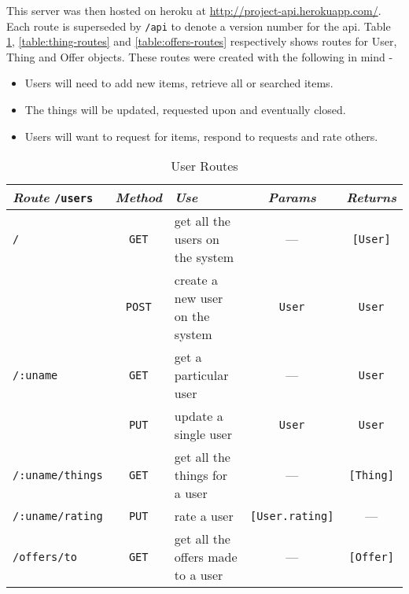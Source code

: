 This server was then hosted on heroku at \href{http://project-api.herokuapp.com/}{http://project-api.herokuapp.com/}. Each route is superseded by \texttt{/api} to denote a version number for the api. Table \ref{table:user-routes}, \ref{table:thing-routes} and \ref{table:offers-routes} respectively shows routes for User, Thing and Offer objects. These routes were created with the following in mind -

\begin{itemize}
	\item Users will need to add new items, retrieve all or searched items.
	\item The things will be updated, requested upon and eventually closed.
	\item Users will want to request for items, respond to requests and rate others.
\end{itemize}

\newcommand{\NA}{---}

\begin{table}[!h]
    \centering
    \begin{tabularx}{\textwidth}{lcXcc}
    \toprule
    \centering
    \emph{\textbf{Route}} \texttt{/users} & \emph{\textbf{Method}} & \emph{\textbf{Use}} & \emph{\textbf{Params}} & \emph{\textbf{Returns}} \\
    \midrule
    \texttt{/}
    		& \texttt{GET} & get all the \newline users on the system  & \NA 			 & \texttt{[User]} \\ \cline{2-5} \noalign{\smallskip}
    		& \texttt{POST} & create a new user on the system  & \texttt{User}  & \texttt{User}    \\ 
    \midrule
    \texttt{/:uname} 
    		& \texttt{GET} & get a particular user & \NA & \texttt{User}  \\ \cline{2-5} \noalign{\smallskip}
    		& \texttt{PUT} & update a single user & \texttt{User} & \texttt{User} \\
    	\midrule
    \texttt{/:uname/things}
    		& \texttt{GET} & get all the things for a user & \NA & \texttt{[Thing]} \\ \cline{1-5} \noalign{\smallskip}
    \texttt{/:uname/rating}
    		& \texttt{PUT} & rate a user & \texttt{[User.rating]} & \NA  \\ \cline{1-5} \noalign{\smallskip}
	\texttt{/offers/to}
		& \texttt{GET} & get all the offers made to a user & \NA & \texttt{[Offer]}  \\
    \bottomrule
    \hline
    \end{tabularx}
    \caption{User Routes}
    \label{table:user-routes}
\end{table}

